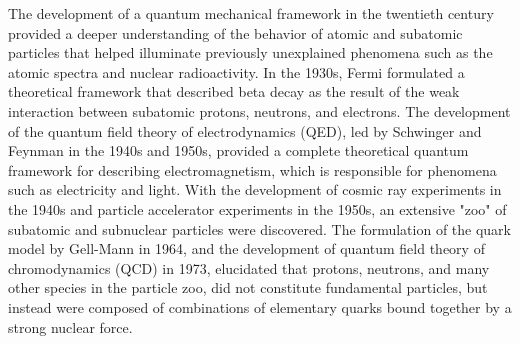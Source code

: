 The development of a quantum mechanical framework in the twentieth century provided a deeper understanding of the behavior of atomic and subatomic particles that helped illuminate previously unexplained phenomena such as the atomic spectra and nuclear radioactivity.
In the 1930s, Fermi formulated a theoretical framework that described beta decay as the result of the weak interaction between subatomic protons, neutrons, and electrons.
The development of the quantum field theory of electrodynamics (QED), led by Schwinger and Feynman in the 1940s and 1950s, provided a complete theoretical quantum framework for describing electromagnetism, which is responsible for phenomena such as electricity and light.
With the development of cosmic ray experiments in the 1940s and particle accelerator experiments in the 1950s, an extensive "zoo" of subatomic and subnuclear particles were discovered.
The formulation of the quark model by Gell-Mann in 1964, and the development of quantum field theory of chromodynamics (QCD) in 1973, elucidated that protons, neutrons, and many other species in the particle zoo, did not constitute fundamental particles, but instead were composed of combinations of elementary quarks bound together by a strong nuclear force.

